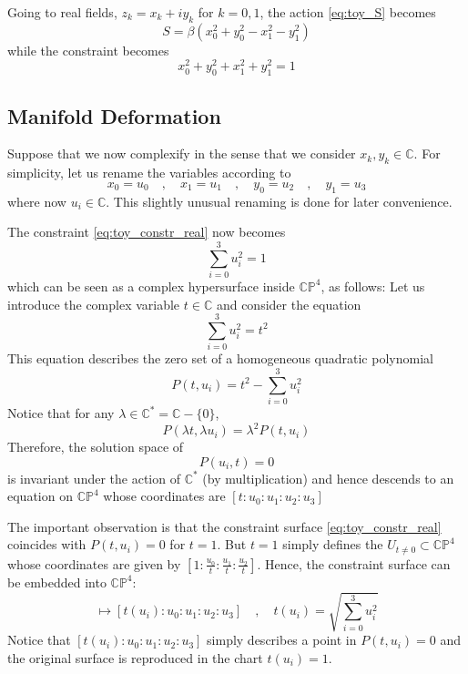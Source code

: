 \documentclass[a4paper,11pt]{article}
\theoremstyle{definition}
\newcommand{\CC}{\mathbb{C}}
\newcommand{\CP}{\mathbb{CP}}
\begin{document}
Going to real fields, $z_k = x_k + i y_k$ for $k = 0,1$, the action \eqref{eq:toy_S} becomes 
\begin{equation}
  S = \beta\left( x_0^2 + y_0^2 - x_1^2 - y_1^2 \right)
  \label{eq:toy_S_real}
\end{equation}
while the constraint becomes
\begin{equation}
  x_0^2 + y_0^2 + x_1^2 + y_1^2 = 1
  \label{eq:toy_constr_real}
\end{equation}

\subsection{Manifold Deformation}
Suppose that we now complexify in the sense that we consider $x_k, y_k \in \CC$.
For simplicity, let us rename the variables according to 
\begin{equation}
  x_0 = u_0 \quad , \quad x_1 = u_1 \quad , \quad  y_0 = u_2 \quad , \quad y_1 = u_3
  \label{eq:toy_us}
\end{equation}
where now $u_i \in \CC$.
This slightly unusual renaming is done for later convenience.

The constraint \eqref{eq:toy_constr_real} now becomes
\begin{equation}
  \sum_{i=0}^3 u_i^2 = 1
\end{equation}
which can be seen as a complex hypersurface inside $\CP^4$, as follows: Let us introduce the complex variable $t \in \CC$ and consider the equation 
\begin{equation}
  \sum_{i=0}^3 u_i^2 = t^2
\end{equation}
This equation describes the zero set of a homogeneous quadratic polynomial 
\begin{equation}
  P(t,u_i) = t^2 - \sum_{i=0}^3 u_i^2
\end{equation}
Notice that for any $\lambda \in \CC^* = \CC - \{ 0 \}$,
\begin{equation}
  P(\lambda t, \lambda u_i) = \lambda^2 P(t,u_i)
\end{equation}
Therefore, the solution space of 
\begin{equation}
  P(u_i,t) = 0
\end{equation}
is invariant under the action of $\CC^*$ (by multiplication) and hence descends to an equation on $\CP^4$ whose coordinates are $[t:u_0:u_1:u_2:u_3]$

The important observation is that the constraint surface \eqref{eq:toy_constr_real} coincides with $P(t,u_i) = 0$ for $t=1$.
But $t=1$ simply defines the $U_{t \neq 0} \subset \CP^4$ whose coordinates are given by $\left[ 1:\tfrac{u_0}{t}:\tfrac{u_1}{t}:\tfrac{u_2}{t}\right]$.
Hence, the constraint surface can be embedded into $\CP^4$:
\begin{equation}
  [u_0:u_1:u_2:u_3] \mapsto [t(u_i):u_0:u_1:u_2:u_3] \quad , \quad t(u_i) = \sqrt{\sum_{i=0}^3 u_i^2} 
  \label{eq:toy_emb}
\end{equation}
Notice that $[t(u_i):u_0:u_1:u_2:u_3]$ simply describes a point in $P(t,u_i) = 0$ and the original surface is reproduced in the chart $t(u_i) = 1$.  
\end{document}
